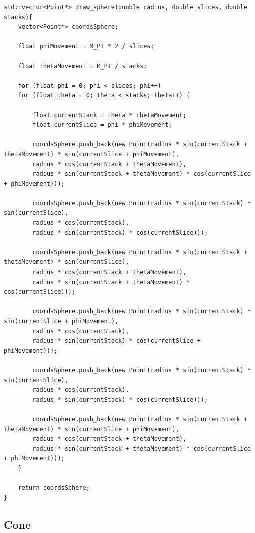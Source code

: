 \documentclass[a4paper]{article}
\begin{document}
\begin{lstlisting}
std::vector<Point*> draw_sphere(double radius, double slices, double stacks){
    vector<Point*> coordsSphere;

    float phiMovement = M_PI * 2 / slices;

    float thetaMovement = M_PI / stacks;

    for (float phi = 0; phi < slices; phi++)
    for (float theta = 0; theta < stacks; theta++) {

        float currentStack = theta * thetaMovement;
        float currentSlice = phi * phiMovement;

        coordsSphere.push_back(new Point(radius * sin(currentStack + thetaMovement) * sin(currentSlice + phiMovement),
        radius * cos(currentStack + thetaMovement),
        radius * sin(currentStack + thetaMovement) * cos(currentSlice + phiMovement)));

        coordsSphere.push_back(new Point(radius * sin(currentStack) * sin(currentSlice),
        radius * cos(currentStack),
        radius * sin(currentStack) * cos(currentSlice)));

        coordsSphere.push_back(new Point(radius * sin(currentStack + thetaMovement) * sin(currentSlice),
        radius * cos(currentStack + thetaMovement),
        radius * sin(currentStack + thetaMovement) * cos(currentSlice)));

        coordsSphere.push_back(new Point(radius * sin(currentStack) * sin(currentSlice + phiMovement),
        radius * cos(currentStack),
        radius * sin(currentStack) * cos(currentSlice + phiMovement)));

        coordsSphere.push_back(new Point(radius * sin(currentStack) * sin(currentSlice),
        radius * cos(currentStack),
        radius * sin(currentStack) * cos(currentSlice)));

        coordsSphere.push_back(new Point(radius * sin(currentStack + thetaMovement) * sin(currentSlice + phiMovement),
        radius * cos(currentStack + thetaMovement),
        radius * sin(currentStack + thetaMovement) * cos(currentSlice + phiMovement)));
    }

    return coordsSphere;
}

\end{lstlisting}

\subsection{Cone}
\end{document}
